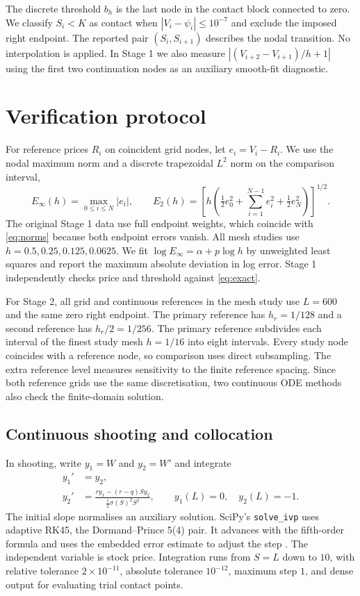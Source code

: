 \documentclass[11pt,a4paper]{article}
\numberwithin{equation}{section}
\begin{document}
The discrete threshold $b_h$ is the last node in the contact block
connected to zero. We classify $S_i<K$ as contact when
$|V_i-\psi_i|\le10^{-7}$ and exclude the imposed right endpoint.
The reported pair $(S_i,S_{i+1})$ describes the nodal transition.
No interpolation is applied. In Stage 1 we also measure
$|(V_{i+2}-V_{i+1})/h+1|$ using the first two continuation nodes
as an auxiliary smooth-fit diagnostic.

\section{Verification protocol}\label{sec:verification}
For reference prices $R_i$ on coincident grid nodes, let
$e_i=V_i-R_i$. We use the nodal maximum norm and a discrete trapezoidal
$L^2$ norm on the comparison interval,
\begin{equation}\label{eq:norms}
 E_\infty(h)=\max_{0\le i\le N}|e_i|,\qquad
 E_2(h)=\left[h\left(\tfrac12 e_0^2+\sum_{i=1}^{N-1}e_i^2+
                   \tfrac12 e_N^2\right)\right]^{1/2}.
\end{equation}
The original Stage 1 data use full endpoint weights, which coincide
with \eqref{eq:norms} because both endpoint errors vanish. All mesh
studies use $h=0.5,0.25,0.125,0.0625$. We fit
$\log E_\infty=\alpha+p\log h$ by unweighted least squares and report
the maximum absolute deviation in log error. Stage 1 independently
checks price and threshold against \eqref{eq:exact}.

For Stage 2, all grid and continuous references in the mesh study use
$L=600$ and the same zero right endpoint. The primary reference has
$h_r=1/128$ and a second reference has $h_r/2=1/256$.
The primary reference subdivides each interval of the finest study mesh
$h=1/16$ into eight intervals. Every study node coincides with a reference
node, so comparison uses direct subsampling. The extra reference level
measures sensitivity to the finite reference spacing. Since both reference
grids use the same discretisation, two continuous ODE methods also check
the finite-domain solution.

\subsection{Continuous shooting and collocation}\label{sec:shooting}
In shooting, write $y_1=W$ and $y_2=W'$ and integrate
\begin{equation}\label{eq:shooting-system}
 \begin{aligned}
 y_1'&=y_2,\\
 y_2'&=\frac{r y_1-(r-q)S y_2}{\tfrac12\sigma(S)^2S^2},
 \qquad y_1(L)=0,\quad y_2(L)=-1.
 \end{aligned}
\end{equation}
The initial slope normalises an auxiliary solution. SciPy's
\texttt{solve\_ivp} uses adaptive RK45, the Dormand--Prince 5(4) pair.
It advances with the fifth-order formula and uses the embedded error
estimate to adjust the step \cite{scipyIVP}. The independent variable
is stock price. Integration runs from $S=L$ down to $10$, with relative
tolerance $2\times10^{-11}$, absolute tolerance $10^{-12}$, maximum step
$1$, and dense output for evaluating trial contact points.
\end{document}

